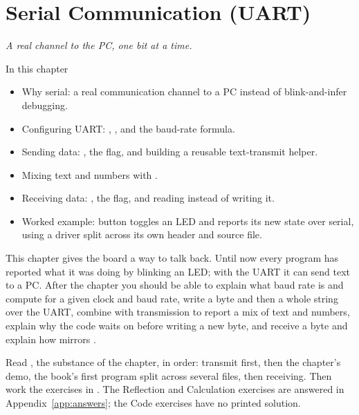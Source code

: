 
\chapter{Serial Communication (UART)}
\label{c6:ch}

{\large\itshape A real channel to the PC, one bit at a time.\par}

\begin{chapterbox}{In this chapter}
\begin{itemize}
  \item Why serial: a real communication channel to a PC instead of blink-and-infer debugging.
  \item Configuring UART: , , and the  baud-rate formula.
  \item Sending data: , the  flag, and building a reusable text-transmit
    helper.
  \item Mixing text and numbers with .
  \item Receiving data: , the  flag, and reading  instead of
    writing it.
  \item Worked example: button toggles an LED and reports its new state over serial, using a
    driver split across its own header and source file.
\end{itemize}
\end{chapterbox}

This chapter gives the board a way to talk back. Until now every program has reported what it was
doing by blinking an LED; with the UART it can send text to a PC. After the chapter you should be
able to explain what baud rate is and compute  for a given clock and baud rate, write a
byte and then a whole string over the UART, combine  with transmission to report a
mix of text and numbers, explain why the code waits on  before writing a new byte, and
receive a byte and explain how  mirrors .

Read , the substance of the chapter, in order: transmit first, then the
chapter's demo, the book's first program split across several files, then receiving. Then work
the exercises in . The Reflection and Calculation exercises are answered
in Appendix~\ref{app:answers}; the Code exercises have no printed solution.




